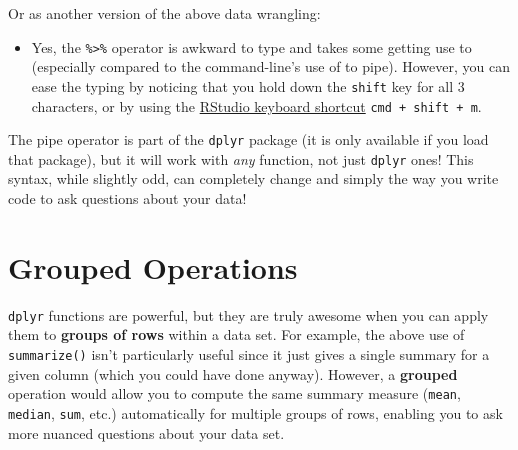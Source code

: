 \documentclass[]{book}
\newenvironment{Shaded}{\begin{snugshade}}{\end{snugshade}}
\newcommand{\KeywordTok}[1]{\textcolor[rgb]{0.13,0.29,0.53}{\textbf{#1}}}
\newcommand{\DataTypeTok}[1]{\textcolor[rgb]{0.13,0.29,0.53}{#1}}
\newcommand{\DecValTok}[1]{\textcolor[rgb]{0.00,0.00,0.81}{#1}}
\newcommand{\StringTok}[1]{\textcolor[rgb]{0.31,0.60,0.02}{#1}}
\newcommand{\CommentTok}[1]{\textcolor[rgb]{0.56,0.35,0.01}{\textit{#1}}}
\newcommand{\OperatorTok}[1]{\textcolor[rgb]{0.81,0.36,0.00}{\textbf{#1}}}
\newcommand{\NormalTok}[1]{#1}
\providecommand{\tightlist}{%
  \setlength{\itemsep}{0pt}\setlength{\parskip}{0pt}}
\theoremstyle{definition}
\theoremstyle{definition}
\theoremstyle{remark}
\begin{document}
Or as another version of the above data wrangling:

\begin{Shaded}
\end{Shaded}

\begin{itemize}
\tightlist
\item
  Yes, the \texttt{\%\textgreater{}\%} operator is awkward to type and
  takes some getting use to (especially compared to the command-line's
  use of \texttt{\textbar{}} to pipe). However, you can ease the typing
  by noticing that you hold down the \texttt{shift} key for all 3
  characters, or by using the
  \href{https://support.rstudio.com/hc/en-us/articles/200711853-Keyboard-Shortcuts}{RStudio
  keyboard shortcut} \texttt{cmd\ +\ shift\ +\ m}.
\end{itemize}

The pipe operator is part of the \texttt{dplyr} package (it is only
available if you load that package), but it will work with \emph{any}
function, not just \texttt{dplyr} ones! This syntax, while slightly odd,
can completely change and simply the way you write code to ask questions
about your data!

\section{Grouped Operations}\label{grouped-operations}

\texttt{dplyr} functions are powerful, but they are truly awesome when
you can apply them to \textbf{groups of rows} within a data set. For
example, the above use of \texttt{summarize()} isn't particularly useful
since it just gives a single summary for a given column (which you could
have done anyway). However, a \textbf{grouped} operation would allow you
to compute the same summary measure (\texttt{mean}, \texttt{median},
\texttt{sum}, etc.) automatically for multiple groups of rows, enabling
you to ask more nuanced questions about your data set.
\end{document}
